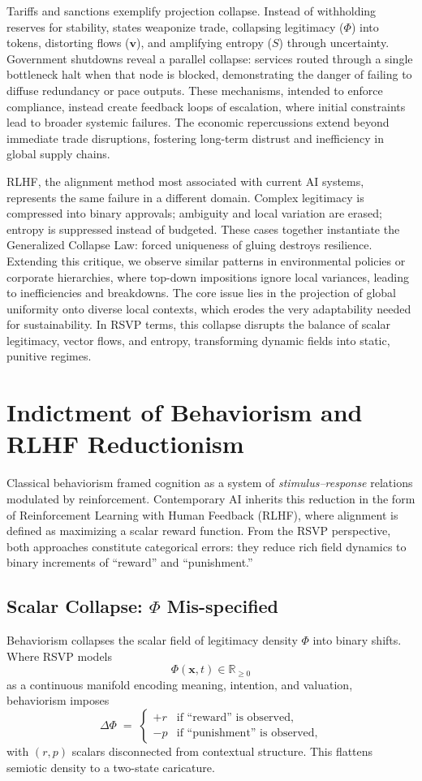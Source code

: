 \documentclass{article}
\begin{document}
Tariffs and sanctions exemplify projection collapse. Instead of withholding reserves for stability, states weaponize trade, collapsing legitimacy ($\Phi$) into tokens, distorting flows ($\mathbf{v}$), and amplifying entropy ($S$) through uncertainty. Government shutdowns reveal a parallel collapse: services routed through a single bottleneck halt when that node is blocked, demonstrating the danger of failing to diffuse redundancy or pace outputs. These mechanisms, intended to enforce compliance, instead create feedback loops of escalation, where initial constraints lead to broader systemic failures. The economic repercussions extend beyond immediate trade disruptions, fostering long-term distrust and inefficiency in global supply chains.

RLHF, the alignment method most associated with current AI systems, represents the same failure in a different domain. Complex legitimacy is compressed into binary approvals; ambiguity and local variation are erased; entropy is suppressed instead of budgeted. These cases together instantiate the Generalized Collapse Law: forced uniqueness of gluing destroys resilience. Extending this critique, we observe similar patterns in environmental policies or corporate hierarchies, where top-down impositions ignore local variances, leading to inefficiencies and breakdowns. The core issue lies in the projection of global uniformity onto diverse local contexts, which erodes the very adaptability needed for sustainability. In RSVP terms, this collapse disrupts the balance of scalar legitimacy, vector flows, and entropy, transforming dynamic fields into static, punitive regimes.

\section{Indictment of Behaviorism and RLHF Reductionism}
\label{sec:behaviorism-rhlf}

Classical behaviorism framed cognition as a system of \emph{stimulus--response}
relations modulated by reinforcement. Contemporary AI inherits this reduction
in the form of Reinforcement Learning with Human Feedback (RLHF), where
alignment is defined as maximizing a scalar reward function. From the RSVP
perspective, both approaches constitute categorical errors: they reduce rich
field dynamics to binary increments of ``reward'' and ``punishment.'' 

\subsection{Scalar Collapse: $\Phi$ Mis-specified}
Behaviorism collapses the scalar field of legitimacy density $\Phi$ into
binary shifts. Where RSVP models
\[
\Phi(\mathbf{x},t) \in \mathbb{R}_{\ge 0}
\]
as a continuous manifold encoding meaning, intention, and valuation,
behaviorism imposes
\[
\Delta \Phi \;=\; \begin{cases}
+ r & \text{if ``reward'' is observed},\\
- p & \text{if ``punishment'' is observed},
\end{cases}
\]
with $(r,p)$ scalars disconnected from contextual structure. This flattens
semiotic density to a two-state caricature.
\end{document}
